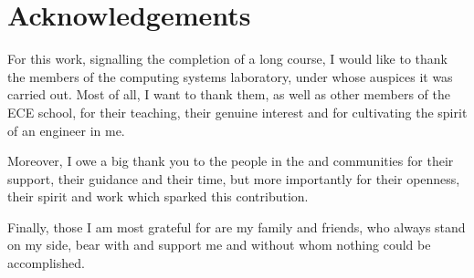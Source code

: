 \chapter*{Acknowledgements}

For this work, signalling the completion of a long course, I would like to thank
the members of the computing systems laboratory, under whose auspices it was
carried out. Most of all, I want to thank them, as well as other members of the
ECE school, for their teaching, their genuine interest and for cultivating the
spirit of an engineer in me.

Moreover, I owe a big thank you to the people in the \osv{} and \viofs{}
communities for their support, their guidance and their time, but more
importantly for their openness, their spirit and work which sparked this
contribution.

Finally, those I am most grateful for are my family and friends, who always
stand on my side, bear with and support me and without whom nothing could
be accomplished.

